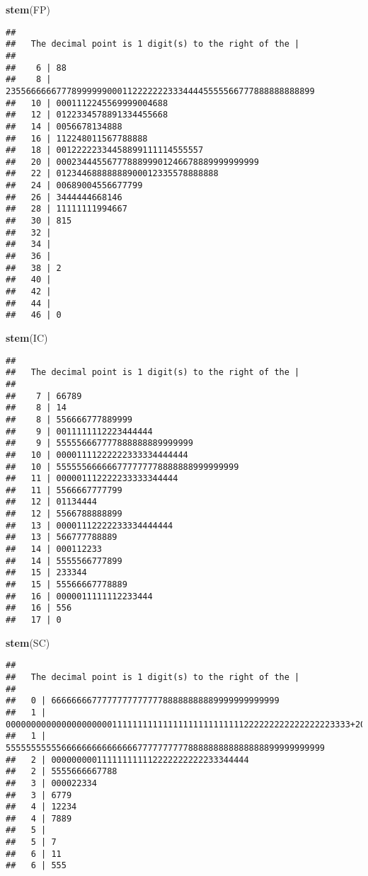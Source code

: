\documentclass[]{article}
\newenvironment{Shaded}{\begin{snugshade}}{\end{snugshade}}
\newcommand{\KeywordTok}[1]{\textcolor[rgb]{0.13,0.29,0.53}{\textbf{#1}}}
\newcommand{\NormalTok}[1]{#1}
\begin{document}
\begin{Shaded}
\begin{Highlighting}[]
\KeywordTok{stem}\NormalTok{(FP)}
\end{Highlighting}
\end{Shaded}

\begin{verbatim}
## 
##   The decimal point is 1 digit(s) to the right of the |
## 
##    6 | 88
##    8 | 2355666666777899999900011222222233344445555566777888888888899
##   10 | 0001112245569999004688
##   12 | 0122334578891334455668
##   14 | 0056678134888
##   16 | 112248011567788888
##   18 | 00122222334458899111114555557
##   20 | 0002344455677788899901246678889999999999
##   22 | 01234468888888900012335578888888
##   24 | 00689004556677799
##   26 | 3444444668146
##   28 | 11111111994667
##   30 | 815
##   32 | 
##   34 | 
##   36 | 
##   38 | 2
##   40 | 
##   42 | 
##   44 | 
##   46 | 0
\end{verbatim}

\begin{Shaded}
\begin{Highlighting}[]
\KeywordTok{stem}\NormalTok{(IC)}
\end{Highlighting}
\end{Shaded}

\begin{verbatim}
## 
##   The decimal point is 1 digit(s) to the right of the |
## 
##    7 | 66789
##    8 | 14
##    8 | 556666777889999
##    9 | 0011111112223444444
##    9 | 555556667777888888889999999
##   10 | 00001111222222333334444444
##   10 | 555555666666777777778888888999999999
##   11 | 000001112222233333344444
##   11 | 5566667777799
##   12 | 01134444
##   12 | 5566788888899
##   13 | 00001112222233334444444
##   13 | 566777788889
##   14 | 000112233
##   14 | 5555566777899
##   15 | 233344
##   15 | 55566667778889
##   16 | 0000011111112233444
##   16 | 556
##   17 | 0
\end{verbatim}

\begin{Shaded}
\begin{Highlighting}[]
\KeywordTok{stem}\NormalTok{(SC)}
\end{Highlighting}
\end{Shaded}

\begin{verbatim}
## 
##   The decimal point is 1 digit(s) to the right of the |
## 
##   0 | 666666667777777777777788888888889999999999999
##   1 | 00000000000000000000011111111111111111111111111222222222222222223333+20
##   1 | 555555555556666666666666667777777777888888888888888899999999999
##   2 | 000000000111111111112222222222233344444
##   2 | 5555666667788
##   3 | 000022334
##   3 | 6779
##   4 | 12234
##   4 | 7889
##   5 | 
##   5 | 7
##   6 | 11
##   6 | 555
\end{verbatim}
\end{document}
